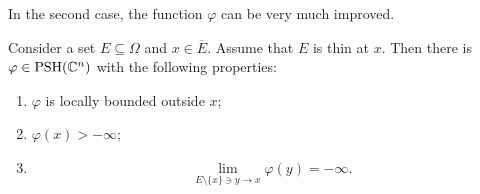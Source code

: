 In the second case, the function $\varphi$ can be very much improved.
\begin{proposition}\label{prop:BTthin}
  Consider a set $E\subseteq \Omega$ and $x\in \overline{E}$. Assume that $E$ is thin at $x$. Then there is $\varphi\in \mathrm{PSH}(\mathbb{C}^n)$ with the following properties:
  \begin{enumerate}
    \item\label{itm:prop:BTthin:1} $\varphi$ is locally bounded outside $x$;
    \item\label{itm:prop:BTthin:2} $\varphi(x)>-\infty$;
    \item\label{itm:prop:BTthin:3}
    \[
    \lim_{E\setminus\{x\} \ni y\to x} \varphi(y)=-\infty.
    \]
  \end{enumerate}
\end{proposition}
